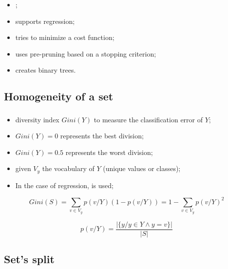 \documentclass[xcolor=table]{beamer}
\begin{document}
\begin{frame}
	\frametitle{\insertsection}
	
	\begin{itemize}
		\item {};
		\item supports regression;
		\item tries to minimize a cost function;
		\item uses pre-pruning based on a stopping criterion;
		\item creates binary trees.
	\end{itemize}
	
\end{frame}

\subsection{Homogeneity of a set}

\begin{frame}
	\frametitle{\insertsection}
	\framesubtitle{\insertsubsection}
	
	\begin{itemize}
		\item diversity index $Gini(Y)$ to measure the classification error of $Y$;
		\item $Gini(Y)=0$ represents the best division;
		\item $Gini(Y)=0.5$ represents the worst division;
		\item given $V_y$ the vocabulary of $Y$ (unique values or classes);
		\item In the case of regression,  is used;
	\end{itemize}
	
	\[Gini(S) = \sum\limits_{v \in V_y} p(v/Y) (1-p(v/Y)) = 1 - \sum\limits_{v \in V_y} p(v/Y)^2 \]
	
	\[p(v/Y) = \frac{|\{y / y \in Y \wedge y = v\}|}{|S|}\]
	
\end{frame}

\subsection{Set's split}
\end{document}
